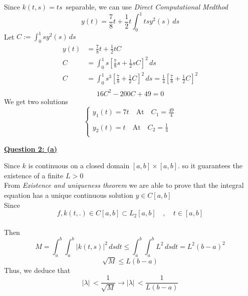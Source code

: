\documentclass[]{article}
\begin{document}
\begin{adjustwidth}{1cm}{2cm}
    Since $k(t,s)=ts  \,$ separable, we can use \textit{Direct Computational Medthod}\\
    \begin{equation*}
        y(t) = \frac{7}{8}t + \frac{1}{2}t \int_0^1 ts y^2(s) \, ds
    \end{equation*}
    Let $\displaystyle C :=\int_0^1 s y^2(s) \, ds$
    \begin{align*}
        y(t) & = \frac{7}{8}t + \frac{1}{2}tC                                                                                       \\
        C    & = \int_0^1 s \left[\frac{7}{8}s + \frac{1}{2}sC\right]^2 \,ds                                                        \\
        C    & = \int_0^1 s^3 \left[\frac{7}{8} + \frac{1}{2}C\right]^2 \,ds = \frac{1}{4}\left[\frac{7}{8} + \frac{1}{2}C\right]^2 \\
    \end{align*}
    \begin{equation*}
        16C^2 -200C+49=0
    \end{equation*}
    We get two solutions
    \[
        \begin{cases}
            \displaystyle y_1(t) = 7t \quad \text{At} \quad C_1 = \frac{49}{4} \\\\
            \displaystyle y_2(t) = t \quad \text{At}  \quad C_2 = \frac{1}{4}  \\
        \end{cases}
    \]
\end{adjustwidth}
\textbf{\underline{Question 2: (a)}}
\begin{adjustwidth}{1cm}{2cm}
    Since $k$ is continuous on a closed domain $[a,b]\times[a,b]$. so it guarantees the existence of a finite  $L>0$\\
    From \textit{Existence and uniqueness theorem} we are able to prove that the integral equation has a unique continuous solution $y\in C[a,b]$\\
    Since
    $$f,k(t,.) \in C[a,b] \subset L_2[a,b] \quad,\quad t \in [a,b]$$\\
    Then
    $$M = \int_a^b \int_a^b |k(t,s)|^2 \, ds dt \leq \int_a^b \int_a^b L^2 \, ds dt = L^2 (b-a)^2 $$
    $$\sqrt{M} \leq L(b-a)$$
    Thus, we deduce that
    $$|\lambda|\,< \frac{1}{\sqrt{M}} \rightarrow |\lambda|\,< \frac{1}{L(b-a)}$$
\end{adjustwidth}
\end{document}
